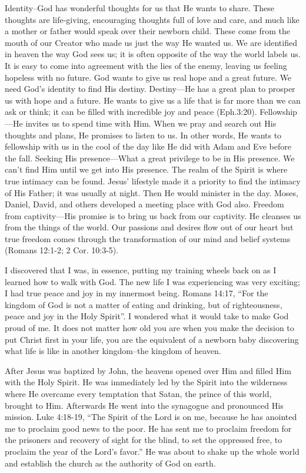 \documentclass[oneside]{book}
\begin{document}
Identity--God has wonderful thoughts for us that He wants to share. These thoughts are life-giving, encouraging thoughts full of love and care, and much like a mother or father would speak over their newborn child. These come from the mouth of our Creator who made us just the way He wanted us. We are identified in heaven the way God sees us; it is often opposite of the way the world labels us. It is easy to come into agreement with the lies of the enemy, leaving us feeling hopeless with no future. God wants to give us real hope and a great future. We need God's identity to find His destiny.
Destiny—He has a great plan to prosper us with hope and a future. He wants to give us     a life that is far more than we can ask or think; it can be filled with incredible joy and peace (Eph.3:20).	
Fellowship—He invites us to spend time with Him. When we pray and search out His thoughts and plans, He promises to listen to us. In other words, He wants to fellowship with us in the cool of the day like He did with Adam and Eve before the fall.	
Seeking His presence—What a great privilege to be in His presence. We can't find Him until we get into His presence. The realm of the Spirit is where true intimacy can be found. Jesus' lifestyle made it a priority to find the intimacy of His Father; it was usually at night. Then He would minister in the day. Moses, Daniel, David, and others developed a meeting place with God also.	
Freedom from captivity—His promise is to bring us back from our captivity. He cleanses us from the things of the world. Our passions and desires flow out of our heart but true freedom comes through the transformation of our mind and belief systems (Romans 12:1-2; 2 Cor. 10:3-5).

I discovered that I was, in essence, putting my training wheels back on as I learned how to walk with God. The new life I was experiencing was very exciting; I had true peace and joy in my innermost being. Romans 14:17, “For the kingdom of God is not a matter of eating and drinking, but of righteousness, peace and joy in the Holy Spirit”. I wondered what it would take to make God proud of me. It does not matter how old you are when you make the decision to put Christ first in your life, you are the equivalent of a newborn baby discovering what life is like in another kingdom--the kingdom of heaven.

After Jesus was baptized by John, the heavens opened over Him and filled Him with the Holy Spirit. He was immediately led by the Spirit into the wilderness where He overcame every temptation that Satan, the prince of this world, brought to Him. Afterwards He went into the synagogue and pronounced His mission. Luke 4:18-19, “The Spirit of the Lord is on me, because he has anointed me to proclaim good news to the poor. He has sent me to proclaim freedom for the prisoners and recovery of sight for the blind, to set the oppressed free, to proclaim the year of the Lord’s favor.” He was about to shake up the whole world and establish the church as the authority of God on earth. 
\end{document}
